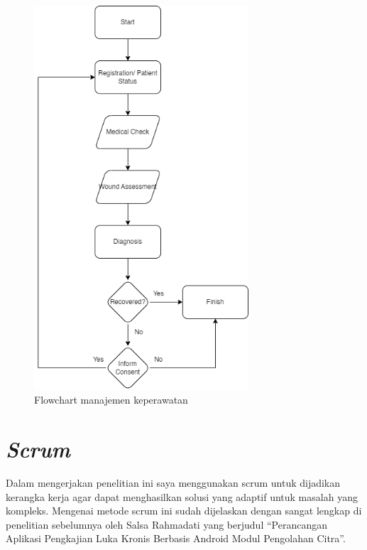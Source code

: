\begin{figure}[H]
	\centering
	\includegraphics[keepaspectratio, width=8cm]{gambar/flowchart_manajemen_perawatan_luka}
	\caption{Flowchart manajemen keperawatan}
	\label{gambar:gambar_73}
\end{figure}

\section{\emph{Scrum}}

Dalam mengerjakan penelitian ini saya menggunakan scrum untuk dijadikan kerangka kerja agar dapat menghasilkan solusi yang adaptif untuk masalah yang kompleks. Mengenai metode scrum ini sudah dijelaskan dengan sangat lengkap di penelitian sebelumnya oleh Salsa Rahmadati yang berjudul “Perancangan Aplikasi Pengkajian Luka Kronis Berbasis Android Modul Pengolahan Citra”.
